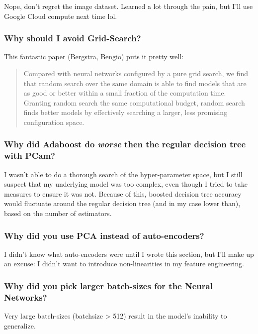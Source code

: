 \documentclass[a4paper]{article}
\begin{document}
Nope, don't regret the image dataset. Learned a lot through the pain, but I'll use Google Cloud compute next time lol.
\subsubsection{Why should I avoid Grid-Search?}
This fantastic paper (Bergstra, Bengio) puts it pretty well:
\begin{quote}
Compared with neural networks configured by a pure grid search, we find that random search over the same domain is able to find models that are as good or better within a small fraction of the computation time. Granting random search the same computational budget, random search finds better models by effectively searching a larger, less promising configuration space.\autocite{bergstra2012random}
\end{quote}
\subsubsection{Why did Adaboost do \textbf{\textit{worse}} then the regular decision tree with PCam?}
I wasn't able to do a thorough search of the hyper-parameter space, but I still suspect that my underlying model was too complex, even though I tried to take measures to ensure it was not. Because of this, boosted decision tree accuracy would fluctuate around the regular decision tree (and in my case lower than), based on the number of estimators.
\subsubsection{Why did you use PCA instead of auto-encoders?}
I didn't know what auto-encoders were until I wrote this section, but I'll make up an excuse: I didn't want to introduce non-linearities in my feature engineering.
\subsubsection{Why did you pick larger batch-sizes for the Neural Networks?}
Very large batch-sizes (batchsize > 512) result in the model's inability to generalize\autocite{DBLP:journals/corr/KeskarMNST16}. 

\printbibliography
\end{document}
